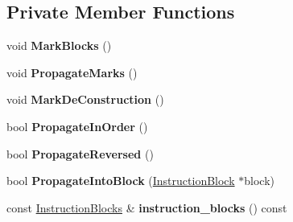 \subsection*{Private Member Functions}
\begin{DoxyCompactItemize}
\item 
void {\bfseries Mark\+Blocks} ()\hypertarget{classv8_1_1internal_1_1compiler_1_1_frame_elider_acee68f54bde8347b9f884f6c52461ee4}{}\label{classv8_1_1internal_1_1compiler_1_1_frame_elider_acee68f54bde8347b9f884f6c52461ee4}

\item 
void {\bfseries Propagate\+Marks} ()\hypertarget{classv8_1_1internal_1_1compiler_1_1_frame_elider_a0b59b6585237f99db0890dc2f2cc6a25}{}\label{classv8_1_1internal_1_1compiler_1_1_frame_elider_a0b59b6585237f99db0890dc2f2cc6a25}

\item 
void {\bfseries Mark\+De\+Construction} ()\hypertarget{classv8_1_1internal_1_1compiler_1_1_frame_elider_afe89c1c3feca9514eb7298245ad85d9d}{}\label{classv8_1_1internal_1_1compiler_1_1_frame_elider_afe89c1c3feca9514eb7298245ad85d9d}

\item 
bool {\bfseries Propagate\+In\+Order} ()\hypertarget{classv8_1_1internal_1_1compiler_1_1_frame_elider_a9bb3c178ffa7e627ed9e5ed62fe5500e}{}\label{classv8_1_1internal_1_1compiler_1_1_frame_elider_a9bb3c178ffa7e627ed9e5ed62fe5500e}

\item 
bool {\bfseries Propagate\+Reversed} ()\hypertarget{classv8_1_1internal_1_1compiler_1_1_frame_elider_adbff39b4888c76b681bc07778a88e0e7}{}\label{classv8_1_1internal_1_1compiler_1_1_frame_elider_adbff39b4888c76b681bc07778a88e0e7}

\item 
bool {\bfseries Propagate\+Into\+Block} (\hyperlink{classv8_1_1internal_1_1compiler_1_1_instruction_block}{Instruction\+Block} $\ast$block)\hypertarget{classv8_1_1internal_1_1compiler_1_1_frame_elider_af4806837b9f516527a7f0ef3f34f1349}{}\label{classv8_1_1internal_1_1compiler_1_1_frame_elider_af4806837b9f516527a7f0ef3f34f1349}

\item 
const \hyperlink{classv8_1_1internal_1_1_zone_vector}{Instruction\+Blocks} \& {\bfseries instruction\+\_\+blocks} () const \hypertarget{classv8_1_1internal_1_1compiler_1_1_frame_elider_a01059e442a982b0970f430db9882a433}{}\label{classv8_1_1internal_1_1compiler_1_1_frame_elider_a01059e442a982b0970f430db9882a433}


\end{DoxyCompactItemize}
